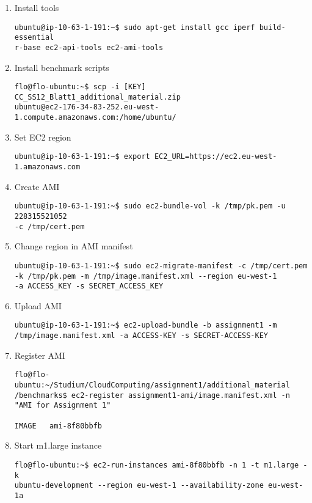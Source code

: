 \documentclass{article}
\begin{document}
\begin{enumerate}
	\item Install tools
\begin{verbatim}
ubuntu@ip-10-63-1-191:~$ sudo apt-get install gcc iperf build-essential 
r-base ec2-api-tools ec2-ami-tools
\end{verbatim}

	\item Install benchmark scripts
	
\begin{verbatim}
flo@flo-ubuntu:~$ scp -i [KEY] CC_SS12_Blatt1_additional_material.zip 
ubuntu@ec2-176-34-83-252.eu-west-1.compute.amazonaws.com:/home/ubuntu/
\end{verbatim}

	\item Set EC2 region
\begin{verbatim}
ubuntu@ip-10-63-1-191:~$ export EC2_URL=https://ec2.eu-west-1.amazonaws.com
\end{verbatim}

	\item Create AMI
\begin{verbatim}
ubuntu@ip-10-63-1-191:~$ sudo ec2-bundle-vol -k /tmp/pk.pem -u 228315521052 
-c /tmp/cert.pem
\end{verbatim}

	\item Change region in AMI manifest
\begin{verbatim}
ubuntu@ip-10-63-1-191:~$ sudo ec2-migrate-manifest -c /tmp/cert.pem 
-k /tmp/pk.pem -m /tmp/image.manifest.xml --region eu-west-1 
-a ACCESS_KEY -s SECRET_ACCESS_KEY
\end{verbatim}

	\item Upload AMI
\begin{verbatim}
ubuntu@ip-10-63-1-191:~$ ec2-upload-bundle -b assignment1 -m 
/tmp/image.manifest.xml -a ACCESS-KEY -s SECRET-ACCESS-KEY
\end{verbatim}

	\item Register AMI
\begin{verbatim}
flo@flo-ubuntu:~/Studium/CloudComputing/assignment1/additional_material
/benchmarks$ ec2-register assignment1-ami/image.manifest.xml -n 
"AMI for Assignment 1"

IMAGE	ami-8f80bbfb
\end{verbatim}

	\item Start m1.large instance
\begin{verbatim}
flo@flo-ubuntu:~$ ec2-run-instances ami-8f80bbfb -n 1 -t m1.large -k 
ubuntu-development --region eu-west-1 --availability-zone eu-west-1a


\end{verbatim}
\end{enumerate}
\end{document}

